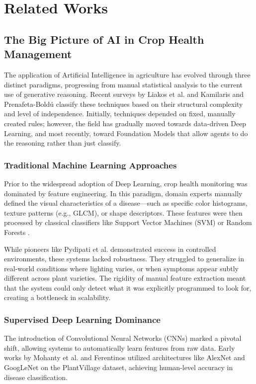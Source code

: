 \chapter{Related Works}
\label{chap:works}
\thispagestyle{open}
\section{The Big Picture of AI in Crop Health Management}

The application of Artificial Intelligence in agriculture has evolved through three distinct paradigms, progressing from manual statistical analysis to the current use of generative reasoning. Recent surveys by Liakos et al. \cite{liakos2018machine} and Kamilaris and Prenafeta-Boldú \cite{kamilaris2018deep} classify these techniques based on their structural complexity and level of independence. Initially, techniques depended on fixed, manually created rules; however, the field has gradually moved towards data-driven Deep Learning, and most recently, toward Foundation Models that allow agents to do the reasoning rather than just classify.

\subsection{Traditional Machine Learning Approaches}
Prior to the widespread adoption of Deep Learning, crop health monitoring was dominated by feature engineering. In this paradigm, domain experts manually defined the visual characteristics of a disease---such as specific color histograms, texture patterns (e.g., GLCM), or shape descriptors. These features were then processed by classical classifiers like Support Vector Machines (SVM) or Random Forests \cite{liakos2018machine}.

While pioneers like Pydipati et al. \cite{pydipati2006identification} demonstrated success in controlled environments, these systems lacked robustness. They struggled to generalize in real-world conditions where lighting varies, or when symptoms appear subtly different across plant varieties. The rigidity of manual feature extraction meant that the system could only detect what it was explicitly programmed to look for, creating a bottleneck in scalability.

\subsection{Supervised Deep Learning Dominance}
The introduction of Convolutional Neural Networks (CNNs) marked a pivotal shift, allowing systems to automatically learn features from raw data. Early works by Mohanty et al. \cite{mohanty2016using} and Ferentinos \cite{ferentinos2018deep} utilized architectures like AlexNet and GoogLeNet on the PlantVillage dataset, achieving human-level accuracy in disease classification.


